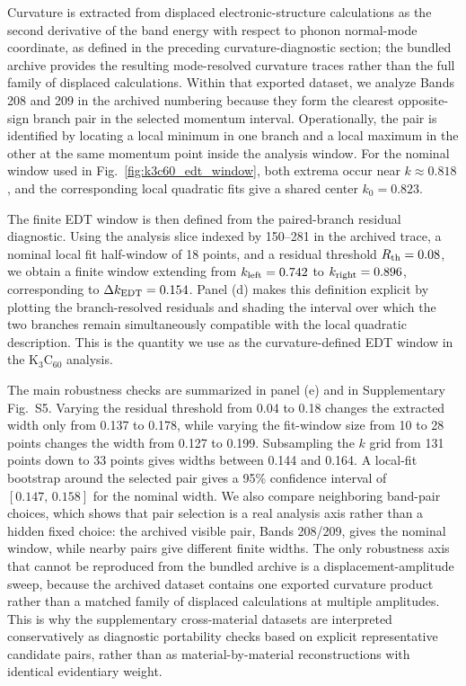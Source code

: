 \documentclass[twocolumn,10pt]{article}
\begin{document}
Curvature is extracted from displaced electronic-structure calculations as the second derivative of the band energy with respect to phonon normal-mode coordinate, as defined in the preceding curvature-diagnostic section; the bundled archive provides the resulting mode-resolved curvature traces rather than the full family of displaced calculations. Within that exported dataset, we analyze Bands 208 and 209 in the archived numbering because they form the clearest opposite-sign branch pair in the selected momentum interval. Operationally, the pair is identified by locating a local minimum in one branch and a local maximum in the other at the same momentum point inside the analysis window. For the nominal window used in Fig.~\ref{fig:k3c60_edt_window}, both extrema occur near $k \approx 0.818$, and the corresponding local quadratic fits give a shared center $k_0 = 0.823$.

The finite EDT window is then defined from the paired-branch residual diagnostic. Using the analysis slice indexed by 150--281 in the archived trace, a nominal local fit half-window of 18 points, and a residual threshold $R_{\rm th}=0.08$, we obtain a finite window extending from $k_{\rm left}=0.742$ to $k_{\rm right}=0.896$, corresponding to $\Delta k_{\rm EDT}=0.154$. Panel (d) makes this definition explicit by plotting the branch-resolved residuals and shading the interval over which the two branches remain simultaneously compatible with the local quadratic description. This is the quantity we use as the curvature-defined EDT window in the K$_3$C$_{60}$ analysis.

The main robustness checks are summarized in panel (e) and in Supplementary Fig.~S5. Varying the residual threshold from 0.04 to 0.18 changes the extracted width only from 0.137 to 0.178, while varying the fit-window size from 10 to 28 points changes the width from 0.127 to 0.199. Subsampling the $k$ grid from 131 points down to 33 points gives widths between 0.144 and 0.164. A local-fit bootstrap around the selected pair gives a 95\% confidence interval of $[0.147,\,0.158]$ for the nominal width. We also compare neighboring band-pair choices, which shows that pair selection is a real analysis axis rather than a hidden fixed choice: the archived visible pair, Bands 208/209, gives the nominal window, while nearby pairs give different finite widths. The only robustness axis that cannot be reproduced from the bundled archive is a displacement-amplitude sweep, because the archived dataset contains one exported curvature product rather than a matched family of displaced calculations at multiple amplitudes. This is why the supplementary cross-material datasets are interpreted conservatively as diagnostic portability checks based on explicit representative candidate pairs, rather than as material-by-material reconstructions with identical evidentiary weight.
\end{document}
